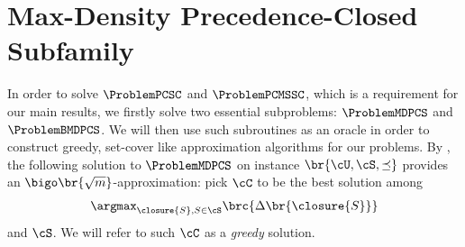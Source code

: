 ﻿\section{Max-Density Precedence-Closed Subfamily} \label{sec:MDPCS}

In order to solve $\ProblemPCSC$ and $\ProblemPCMSSC$, which is a requirement for our main results, we firstly solve two essential subproblems: $\ProblemMDPCS$ and $\ProblemBMDPCS$. We will then use such subroutines as an oracle in order to construct greedy, set-cover like approximation algorithms for our problems.
By \cite{PCMSSC}, the following solution to $\ProblemMDPCS$ on instance $\br{\cU,\cS,\preceq}$ provides an $\bigo\br{\sqrt{m}}$-approximation: pick $\cC$ to be the best solution among
\[
\argmax_{\closure{S}, S\in\cS} \brc{\Delta\br{\closure{S}}}
\]
and $\cS$.
We will refer to such $\cC$ as a \emph{greedy} solution.
%

